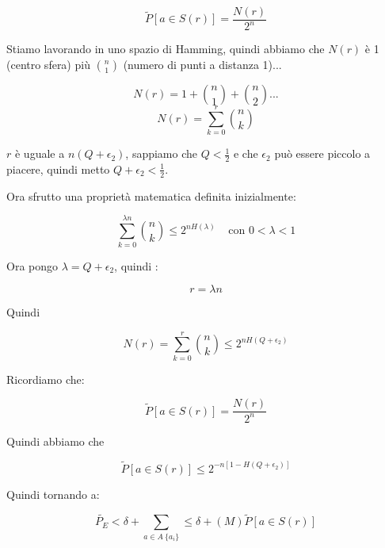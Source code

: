 \begin{equation*}
\tilde{P}[a\in S(r)] = \frac{N(r)}{2^n}
\end{equation*}

Stiamo lavorando in uno spazio di Hamming, quindi abbiamo che $N(r)$ è 1 (centro sfera) più $\binom{n}{1}$ (numero di punti a distanza 1)...

\begin{equation*}
N(r) = 1 + \binom{n}{1} + \binom{n}{2} ...
\end{equation*}
\begin{equation*}
N(r) = \sum_{k=0}^r \binom{n}{k}
\end{equation*}

$r$ è uguale a $n(Q+\epsilon_2)$, sappiamo che $Q<\frac12$ e che $\epsilon_2$ può essere piccolo a piacere, quindi metto $Q+\epsilon_2<\frac12$.

Ora sfrutto una proprietà matematica definita inizialmente:

\begin{equation*}
\sum_{k=0}^{\lambda n} \binom{n}{k} \leq 2^{nH(\lambda)} \; \; \; \; \text{con } 0 < \lambda < 1
\end{equation*}

Ora pongo $\lambda = Q + \epsilon_2$, quindi :

\begin{equation*}
r = \lambda n
\end{equation*}

Quindi

\begin{equation*}
N(r) = \sum_{k=0}^r \binom{n}{k} \leq 2^{nH(Q+\epsilon_2)}
\end{equation*}

\newpage

Ricordiamo che:

\begin{equation*}
\tilde{P}[a\in S(r)] = \frac{N(r)}{2^n}
\end{equation*}

Quindi abbiamo che 

\begin{equation*}
\tilde{P}[a \in S(r)] \leq 2^{-n[1 - H(Q + \epsilon_2)]}
\end{equation*}

Quindi tornando a: 

\begin{equation*}
\tilde{P_E} < \delta + \sum_{a \in A \ \{a_i\}} \leq \delta + (M) \tilde{P}[a \in S(r)]
\end{equation*}

